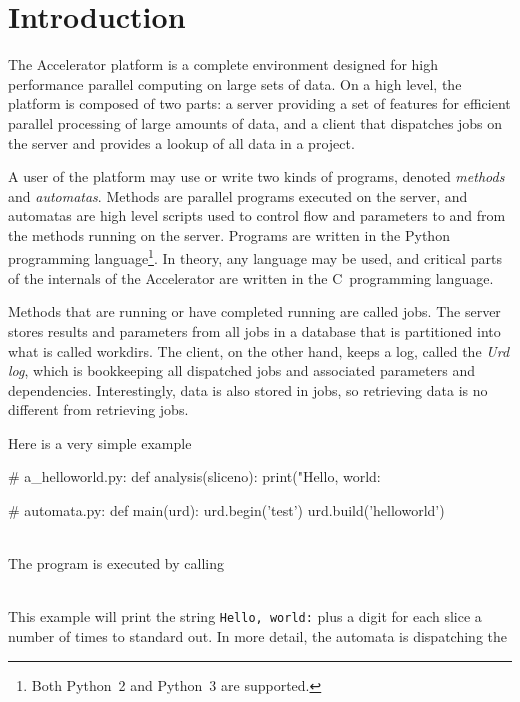 
\section{Introduction}

The Accelerator platform is a complete environment designed for high
performance parallel computing on large sets of data.  On a high
level, the platform is composed of two parts: a server providing a set
of features for efficient parallel processing of large amounts of
data, and a client that dispatches jobs on the server and provides a
lookup of all data in a project.

A user of the platform may use or write two kinds of programs, denoted
\textsl{methods} and \textsl{automatas}.  Methods are parallel
programs executed on the server, and automatas are high level scripts
used to control flow and parameters to and from the methods running on
the server.  Programs are written in the Python programming
language\footnote{Both Python~2 and Python~3 are supported.}.  In
theory, any language may be used, and critical parts of the internals
of the Accelerator are written in the C~programming language.

Methods that are running or have completed running are called jobs.
The server stores results and parameters from all jobs in a database
that is partitioned into what is called workdirs.  The client, on the
other hand, keeps a log, called the \textsl{Urd log}, which is
bookkeeping all dispatched jobs and associated parameters and
dependencies.  Interestingly, data is also stored in jobs, so
retrieving data is no different from retrieving jobs.

Here is a very simple example
\\
\begin{python}
# a_helloworld.py:
def analysis(sliceno):
  print("Hello, world: %

# automata.py:
def main(urd):
  urd.begin('test')
  urd.build('helloworld')
\end{python}
\\
The program is executed by calling
\\
\begin{shell}
\end{shell}
\\
This example will print the string \texttt{Hello, world:} plus a digit
for each slice a number of
times to standard
out.  In more detail, the automata is dispatching the



